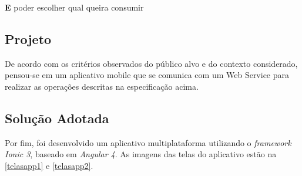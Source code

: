 \textbf{E} poder escolher qual queira consumir

\subsection{Projeto}

De acordo com os critérios observados do público alvo e do contexto considerado, pensou-se em um aplicativo mobile que se comunica com um Web Service para realizar as operações descritas na especificação acima.

\subsection{Solução Adotada}

Por fim, foi desenvolvido um aplicativo multiplataforma utilizando o \textit{framework Ionic 3}, baseado em \textit{Angular 4}. As imagens das telas do aplicativo estão na \ref{telasapp1} e \ref{telasapp2}.

